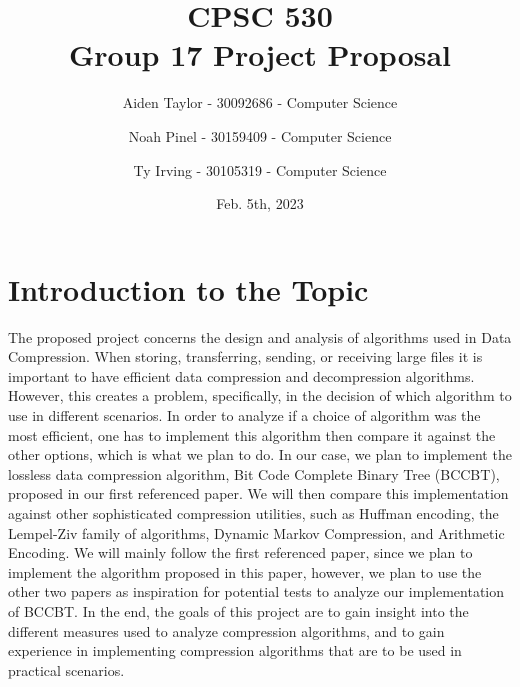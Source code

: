 \documentclass[11pt]{article}
\title{CPSC 530 \\ \Large Group 17 Project Proposal}
\author{
Aiden Taylor - 30092686 - Computer Science
\and
Noah Pinel - 30159409 - Computer Science
\and
Ty Irving - 30105319 - Computer Science
}
\date{Feb. 5th, 2023}
\begin{document}
\maketitle
\newpage

\section*{Introduction to the Topic}
The proposed project concerns the design and analysis of algorithms used in Data Compression.
When storing, transferring, sending, or receiving large files it is important to have efficient data compression and decompression algorithms.
However, this creates a problem, specifically, in the decision of which algorithm to use in different scenarios.
In order to analyze if a choice of algorithm was the most efficient, one has to implement this algorithm then compare it against the other options,
which is what we plan to do.
In our case, we plan to implement
the lossless data compression algorithm, Bit Code Complete Binary Tree (BCCBT), proposed in our first referenced paper. 
We will then compare this implementation against other sophisticated compression utilities,
such as Huffman encoding, the Lempel-Ziv family of algorithms, Dynamic Markov Compression, and Arithmetic Encoding.
We will mainly follow the first referenced paper, since we plan to implement the algorithm proposed in this paper,
however, we plan to use the other two papers as inspiration for potential tests to analyze our implementation of BCCBT.
In the end, the goals of this project are to gain insight into the different measures used to analyze compression algorithms,
and to gain experience in implementing compression algorithms that are to be used in practical scenarios.
\end{document}

